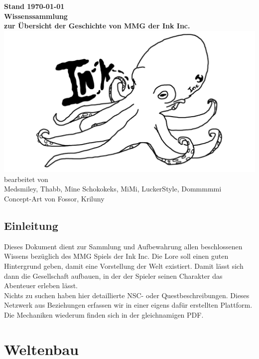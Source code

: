 \documentclass[a4paper,12pt,%
headsepline,%
numbers=noenddot,%
]{scrreprt}
\begin{document}
\begin{titlepage}
	\centering
	\vfill
	\Large{\textbf{Stand {\today}}} \\ \bigskip
	\vfill
	\textsf{\textbf{\Huge{Wissenssammlung}}} \\ \bigskip
	\Large{\textbf{zur Übersicht der Geschichte von MMG der Ink Inc.}} \\ \bigskip
	\vfill
	\includegraphics[width=\linewidth]{Abbildungen/logo.png} \\ \bigskip
	\vfill
	\large
	bearbeitet von\\
	Medsmiley, Thabb, Mine Schokokeks, MiMi, LuckerStyle, Dommmmmi \\ \bigskip
	Concept-Art von Fossor, Kriluny
\end{titlepage}

\tableofcontents
\listoffigures



\chapter*{Einleitung}
Dieses Dokument dient zur Sammlung und Aufbewahrung allen beschlossenen Wissens bezüglich des MMG Spiels der Ink Inc. 
Die Lore soll einen guten Hintergrund geben, damit eine Vorstellung der Welt existiert. 
Damit lässt sich dann die Gesellschaft aufbauen, in der der Spieler seinen Charakter das Abenteuer erleben lässt. \\

Nichts zu suchen haben hier detaillierte NSC- oder Questbeschreibungen. 
Dieses Netzwerk aus Beziehungen erfassen wir in einer eigens dafür erstellten Plattform. 
Die Mechaniken wiederum finden sich in der gleichnamigen PDF.

\part{Weltenbau}
 



\end{document}
